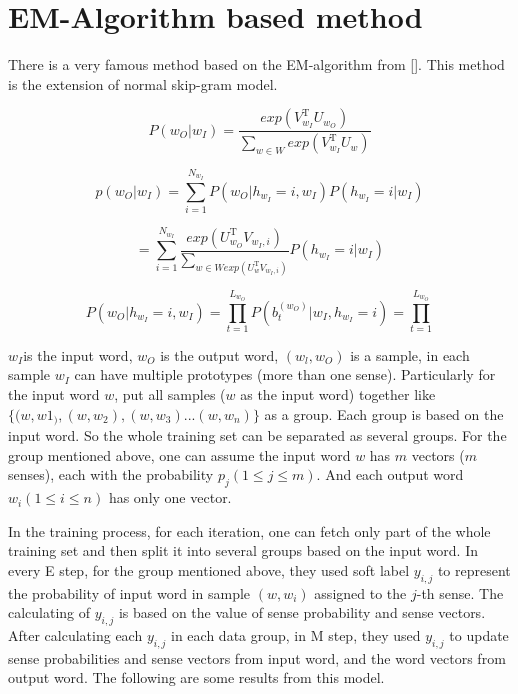 \section{EM-Algorithm based method}


There is a very famous method based on the EM-algorithm from []. This method is the extension of normal skip-gram model. 

$$P(w_O|w_I)=\frac{exp(V^\mathrm{T}_{w_I}U_{w_O})}{\sum_{w\in W}exp(V^\mathrm{T}_{w_I}U_w)}$$

$$p(w_O|w_I)=\sum^{N_{w_I}}_{i=1}P(w_O|h_{w_I}=i,w_I)P(h_{w_I}=i|w_I)$$

$$=\sum^{N_{w_I}}_{i=1}\frac{exp(U^{\mathrm{T}}_{w_O}V_{w_I,i})}{\sum_{w\in W exp(U^\mathrm{T}_w V_{w_I,i})}}P(h_{w_I}=i|w_I)$$

$$P(w_O|h_{w_I}=i,w_I)=\prod^{L_{w_O}}_{t=1}P(b^{(w_O)}_t|w_I,h_{w_I}=i)=\prod^{L_{w_O}}_{t=1}$$


$w_I$is the input word, $w_O$ is the output word, $(w_l, w_O)$ is a sample, in each sample $w_I$ can have multiple prototypes (more than one sense). Particularly for the input word $w$, put all samples ($w$ as the input word) together like $\{(w, w1_), (w, w_2), (w, w_3) ... (w, w_n)\}$ as a group. Each group is based on the input word. So the whole training set can be separated as several groups. For the group mentioned above, one can assume the input word $w$ has $m$ vectors ($m$ senses), each with the probability $p_j (1 \leq j \leq m)$. And each output word $w_i (1 \leq i\leq n)$ has only one vector. 


In the training process, for each iteration, one can fetch only part of the whole training set and then split it into several groups based on the input word. In every E step, for the group mentioned above, they used soft label $y_{i,j}$ to represent the probability of input word in sample $(w,w_i)$ assigned to the $j$-th sense. The calculating of $y_{i,j}$ is based on the value of sense probability and sense vectors. After calculating each $y_{i,j}$ in each data group, in M step, they used $y_{i,j}$ to update sense probabilities and sense vectors from input word, and the word vectors from output word. The following are some results from this model.

